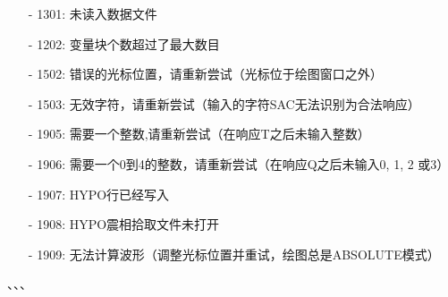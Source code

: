 \begin{itemize}
\item[-]1301: 未读入数据文件
\item[-]1202: 变量块个数超过了最大数目
\end{itemize}

\begin{itemize}
\item[-]1502: 错误的光标位置，请重新尝试（光标位于绘图窗口之外）
\item[-]1503: 无效字符，请重新尝试（输入的字符SAC无法识别为合法响应）
\item[-]1905: 需要一个整数,请重新尝试（在响应T之后未输入整数）
\item[-]1906: 需要一个0到4的整数，请重新尝试（在响应Q之后未输入0, 1, 2 或3）
\item[-]1907: HYPO行已经写入
\item[-]1908: HYPO震相拾取文件未打开
\item[-]1909: 无法计算波形（调整光标位置并重试，绘图总是ABSOLUTE模式）
\end{itemize}

、、、
